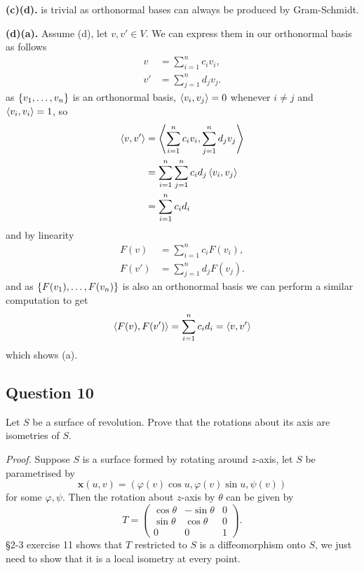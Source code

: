 \documentclass[12pt]{article}
\begin{document}
\textbf{(c)\Rightarrow(d).} is trivial as orthonormal bases can always be produced by Gram-Schmidt.

\textbf{(d)\Rightarrow(a).} Assume (d), let \(v,v'\in V\).
We can express them in our orthonormal basis as follows
\begin{align*}
    v &= \sum_{i=1}^n c_i v_i,\\
    v' &= \sum_{j=1}^n d_j v_j.
\end{align*}
as \(\left\{ v_1,\dots,v_n \right\}\) is an orthonormal basis, \(\left\langle v_i,v_j \right\rangle = 0\) whenever \(i\ne j\) and \(\left\langle v_i,v_i \right\rangle = 1\), so
\begin{align*}
    \left\langle v,v' \right\rangle &= \left\langle  \sum_{i=1}^n c_i v_i, \sum_{j=1}^n d_j v_j  \right\rangle \\
                 &= \sum_{i=1}^n \sum_{j=1}^n c_i d_j \left\langle v_i,v_j \right\rangle \\
                 &= \sum_{i=1}^n c_i d_i
\end{align*}
and by linearity
\begin{align*}
    F(v) &= \sum_{i=1}^n c_i F(v_i),\\
    F(v') &= \sum_{j=1}^n d_j F(v_j).
\end{align*}
and as \(\left\{ F(v_1),\dots,F(v_n) \right\}\) is also an orthonormal basis we can perform a similar computation to get
\[ \left\langle F(v),F(v') \right\rangle = \sum_{i=1}^n c_i d_i = \left\langle v,v' \right\rangle  \]
which shows (a).


\subsection*{Question 10}

Let \(S\) be a surface of revolution. Prove that the rotations about its axis are isometries of \(S\).

\emph{Proof.}
Suppose \(S\) is a surface formed by rotating around \(z\)-axis, let \(S\) be parametrised by
\[ \mathbf{x}(u,v) = (\varphi(v)\cos u, \varphi(v)\sin u, \psi(v)) \]
for some \(\varphi, \psi\).
Then the rotation about \(z\)-axis by \(\theta\) can be given by
\[ T = \begin{pmatrix}
    \cos\theta & -\sin\theta & 0 \\
    \sin\theta & \cos\theta & 0 \\
    0 & 0 & 1
\end{pmatrix}. \]
§2-3 exercise 11 shows that \(T\) restricted to \(S\) is a diffeomorphism onto \(S\),
we just need to show that it is a local isometry at every point.
\end{document}
